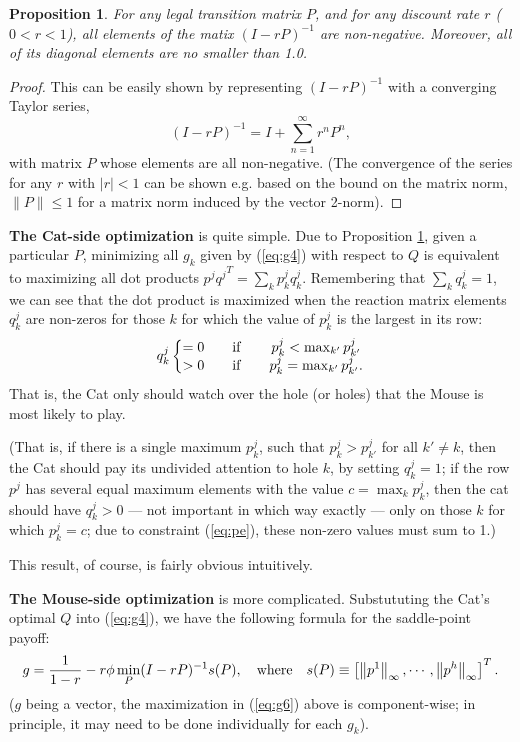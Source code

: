 \documentclass[12pt]{article}
\newcommand{\inorm}[1]{\left\|{#1}\right\|_\infty}
\newtheorem{proposition}{Proposition}
\begin{document}
\begin{proposition}
\label{prop:inv}
For any legal transition matrix $P$, and for any discount rate $r$ ($0<r<1$), all elements of the matix $(I - rP)^{-1}$ are non-negative. Moreover, all of its diagonal elements are no smaller than 1.0.
\end{proposition}
\begin{proof}
This can be easily shown by representing  $(I - rP)^{-1}$ with a converging Taylor series,  
$$
(I - rP)^{-1} = I + \sum_{n=1}^\infty r^n P^n,
$$ 
with matrix $P$ whose elements are all non-negative. (The convergence of the series for any $r$ with $|r|<1$ can be shown e.g. based on the bound on the matrix norm, $\|P\|\le 1$ for a matrix norm induced by the  vector 2-norm).
\end{proof}

{\bf The Cat-side optimization} is quite simple. Due to Proposition \ref{prop:inv}, given a particular $P$, minimizing all $g_k$ given by (\ref{eq:g4}) with respect to $Q$ is equivalent to maximizing all dot products $p^j {q^j}^T = \sum_k p^j_k q^j_k$. Remembering that $\sum_k q^j_k=1$, we can see that the dot product is maximized when the reaction matrix elements $q^j_k$ are non-zeros for those $k$ for which the value of $p^j_k$ is the largest in its row:
\begin{equation}
\label{eq:qopt}
q^j_k  
\left\{ \begin{matrix}
 = 0           & \quad   {\rm if} \quad &  p^j_k < \max_{k'} p^j_{k'}  \\
 > 0   & \quad {\rm if}   \quad &  p^j_k = \max_{k'} p^j_{k'}.
\end{matrix} \right.
\end{equation}
That is, the Cat only should watch over the hole (or holes) that the Mouse is most likely to play. 

(That is, if there is a single maximum $p^j_k$, such that $p^j_k >p^j_{k'}$ for all $k' \ne k$, then the Cat should pay its undivided attention to hole $k$, by setting $q^j_k=1$; if the row $p^j$ has several equal maximum elements with the value $c=\max_k p^j_k$, then the cat should have $q^j_k > 0$ --- not important in which way exactly --- only on those $k$ for which $p^j_k=c$; due to constraint (\ref{eq:pe}), these non-zero values must sum to 1.) 

This result, of course, is fairly obvious intuitively.

{\bf The Mouse-side optimization} is more complicated. Substututing the Cat's optimal $Q$ into  (\ref{eq:g4}), we have the following formula for the saddle-point payoff:
\begin{equation}
\label{eq:g6}
g =  \frac{1}{1 - r}  - r \phi \min_P (I - rP)^{-1} s(P), \quad 
{\rm where} \quad s(P) \equiv \left[ \inorm{p^1}, \cdots, \inorm{p^h}\right]^T.
\end{equation}
($g$ being a vector, the maximization in (\ref{eq:g6}) above is component-wise;  in principle, it may need to be done individually for each $g_k$).
\end{document}
